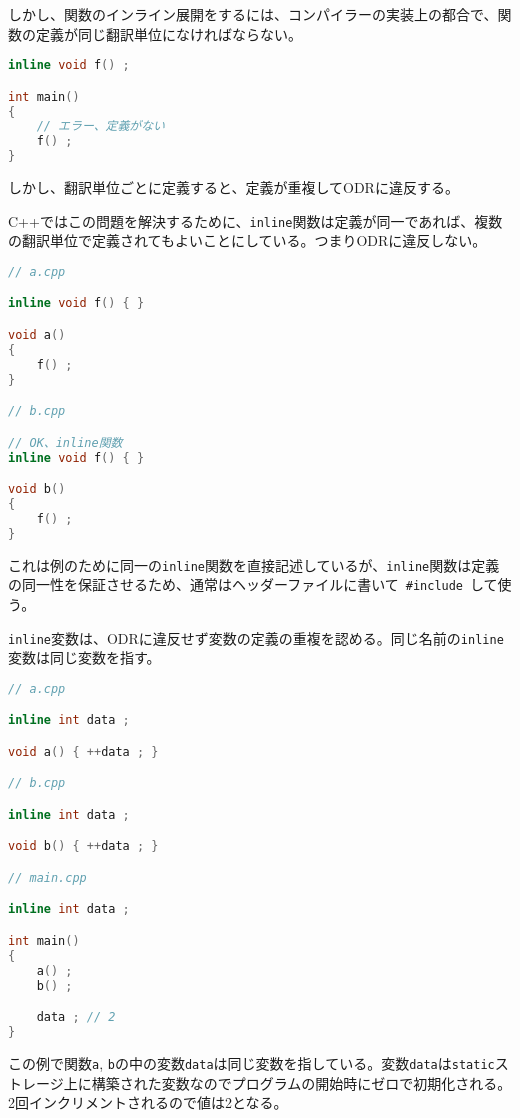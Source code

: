 しかし、関数のインライン展開をするには、コンパイラーの実装上の都合で、関数の定義が同じ翻訳単位になければならない。

\begin{lstlisting}[language=C++]
inline void f() ;

int main()
{
    // エラー、定義がない
    f() ; 
}
\end{lstlisting}

しかし、翻訳単位ごとに定義すると、定義が重複してODRに違反する。

C++ではこの問題を解決するために、\lstinline!inline!関数は定義が同一であれば、複数の翻訳単位で定義されてもよいことにしている。つまりODRに違反しない。

\begin{lstlisting}[language=C++]
// a.cpp

inline void f() { }

void a()
{
    f() ;
}

// b.cpp

// OK、inline関数
inline void f() { }

void b()
{
    f() ;
}
\end{lstlisting}

これは例のために同一の\lstinline!inline!関数を直接記述しているが、\lstinline!inline!関数は定義の同一性を保証させるため、通常はヘッダーファイルに書いて~\lstinline!#include!~して使う。

%

\lstinline!inline!変数は、ODRに違反せず変数の定義の重複を認める。同じ名前の\lstinline!inline!変数は同じ変数を指す。

\begin{lstlisting}[language=C++]
// a.cpp

inline int data ;

void a() { ++data ; }

// b.cpp

inline int data ;

void b() { ++data ; }

// main.cpp

inline int data ;

int main()
{
    a() ;
    b() ;

    data ; // 2
}
\end{lstlisting}

この例で関数\lstinline!a!,
\lstinline!b!の中の変数\lstinline!data!は同じ変数を指している。変数\lstinline!data!は\lstinline!static!ストレージ上に構築された変数なのでプログラムの開始時にゼロで初期化される。2回インクリメントされるので値は2となる。

